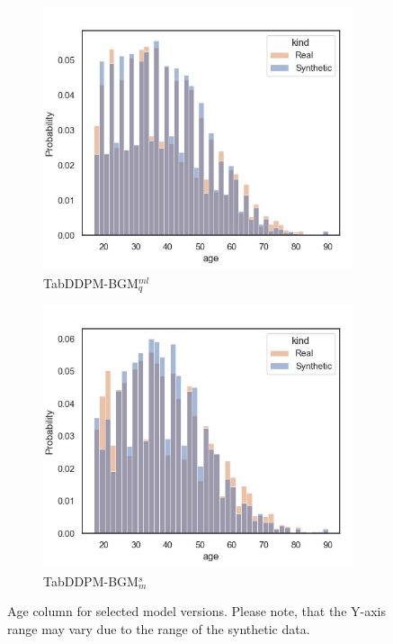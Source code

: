 \begin{figure}[h]
\begin{subfigure}{0.23\textwidth}
		\includegraphics[width=\textwidth]{images/dist_age/tab-ddpm-bgm.jpg}
		\caption{TabDDPM-BGM$^{ml}_q$}
	\end{subfigure}
	\begin{subfigure}{0.23\textwidth}
		\centering
		\includegraphics[width=\textwidth]{images/dist_age/tab-ddpm-bgm-simTune-minmax.jpg}
		\caption{TabDDPM-BGM$^{s}_m$}
	\end{subfigure}
	\caption{Age column for selected model versions. Please note, that the Y-axis range may vary due to the range of the synthetic data.}
	\label{fig:age}
\end{figure}


